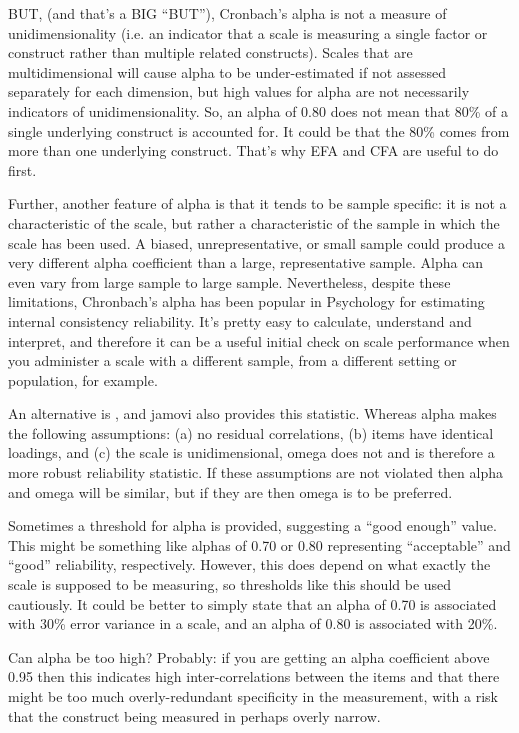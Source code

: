 BUT, (and that’s a BIG “BUT”), Cronbach’s alpha is not a measure of unidimensionality (i.e. an indicator that a scale is measuring a single factor or construct rather than multiple related constructs). Scales that are multidimensional will cause alpha to be under-estimated if not assessed separately for each dimension, but high values for alpha are not necessarily indicators of unidimensionality. So, an alpha of 0.80 does not mean that 80\% of a single underlying construct is accounted for. It could be that the 80\% comes from more than one underlying construct. That’s why EFA and CFA are useful to do first.

Further, another feature of alpha is that it tends to be sample specific: it is not a characteristic of the scale, but rather a characteristic of the sample in which the scale has been used. A biased, unrepresentative, or small sample could produce a very different alpha coefficient than a large, representative sample. Alpha can even vary from large sample to large sample. Nevertheless, despite these limitations, Chronbach’s alpha has been popular in Psychology for estimating internal consistency reliability. It’s pretty easy to calculate, understand and interpret, and therefore it can be a useful initial check on scale performance when you administer a scale with a different sample, from a different setting or population, for example. 

An alternative is , and jamovi also provides this statistic. Whereas alpha makes the following assumptions: (a) no residual correlations, (b) items have identical loadings, and (c) the scale is unidimensional, omega does not and is therefore a more robust reliability statistic. If these assumptions are not violated then alpha and omega will be similar, but if they are then omega is to be preferred. 

Sometimes a threshold for alpha is provided, suggesting a “good enough” value. This might be something like alphas of 0.70 or 0.80 representing “acceptable” and “good” reliability, respectively. However, this does depend on what exactly the scale is supposed to be measuring, so thresholds like this should be used cautiously. It could be better to simply state that an alpha of 0.70 is associated with 30\% error variance in a scale, and an alpha of 0.80 is associated with 20\%.

Can alpha be too high? Probably: if you are getting an alpha coefficient above 0.95 then this indicates high inter-correlations between the items and that there might be too much overly-redundant specificity in the measurement, with a risk that the construct being measured in perhaps overly narrow. 

